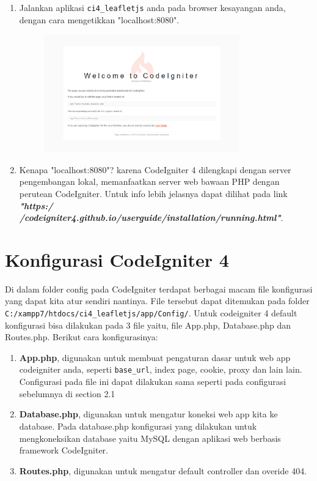 \begin{enumerate}
\begin{enumerate}
    		\item Jalankan aplikasi \verb|ci4_leafletjs| anda pada browser kesayangan anda, dengan cara mengetikkan "localhost:8080".
    		\begin{figure}[!htbp]
        		\centering
        		\includegraphics[width=0.8\textwidth]{figures/CODEIGNITER4/CI9.png}
        		\label{CodeIgniter10}
    		\end{figure}
    		
    		\item Kenapa "localhost:8080"? karena CodeIgniter 4 dilengkapi dengan server pengembangan lokal, memanfaatkan server web bawaan PHP dengan perutean CodeIgniter. Untuk info lebih jelasnya dapat dilihat pada link \textbf{\textit{"https:/ /codeigniter4.github.io/userguide/installation/running.html"}}.
		\end{enumerate}
    \end{enumerate}
    
    
    
    
    
\section{Konfigurasi CodeIgniter 4}
Di dalam folder config pada CodeIgniter terdapat berbagai macam file konfigurasi yang dapat kita atur sendiri nantinya. File tersebut dapat ditemukan pada folder \verb|C:/xampp7/htdocs/ci4_leafletjs/app/Config/|. Untuk codeigniter 4 default konfigurasi bisa dilakukan pada 3 file yaitu, file App.php, Database.php dan Routes.php. Berikut cara konfigurasinya:
\begin{enumerate}
    \item \textbf{App.php}, digunakan untuk membuat pengaturan dasar untuk web app codeigniter anda, seperti \verb|base_url|, index page, cookie, proxy dan lain lain. Configurasi pada file ini dapat dilakukan sama seperti pada configurasi sebelumnya di section 2.1
    \item \textbf{Database.php}, digunakan untuk mengatur koneksi web app kita ke database. Pada database.php konfigurasi yang dilakukan untuk mengkoneksikan database yaitu MySQL dengan aplikasi web berbasis framework CodeIgniter.
    \item \textbf{Routes.php}, digunakan untuk mengatur default controller dan overide 404.
\end{enumerate}





